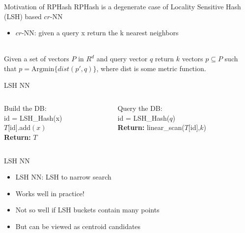 \documentclass[12pt]{beamer}
\begin{document}
\begin{frame}[plain]{Motivation of RPHash}
RPHash is a degenerate case of Locality Sensitive Hash (LSH) based $cr$-NN
\begin{itemize}
  \item $cr$-NN: given a query x return the k nearest neighbors
\end{itemize}
\begin{Definition} \cite{Samet}\\
Given a set of vectors $P$ in $R^d$ and query vector $q$ return $k$ vectors $p\subseteq P$ such that
$p=\text{Argmin}\{dist(p',q)\}$, where dist is some metric function.
\end{Definition}
\end{frame}

\begin{frame}[plain]{LSH NN}

\begin{columns}
      \begin{column}{.5\linewidth}
	Build the DB:\\
	\vspace*{1\bigskipamount}
	\DontPrintSemicolon
	{	id = LSH\_Hash(x)\\
		$T$[id].add$(x)$\\
	}
	\textbf{Return:} $T$
      \end{column}
      
      \begin{column}{.5\linewidth}
	  Query the DB:\\
	  \vspace*{1.5\bigskipamount}
	  \DontPrintSemicolon
	  id = LSH\_Hash($q$)\\
	  \textbf{Return:} linear\_scan($T$[id],$k$)\\
      \end{column}
\end{columns}

\end{frame}


\begin{frame}[plain]{LSH NN}
\begin{itemize}
  \item LSH NN: LSH to narrow search
  \item Works well in practice!
  \item Not so well if LSH buckets contain many points
  \item But can be viewed as centroid candidates
\end{itemize}
\end{frame}
\end{document}

